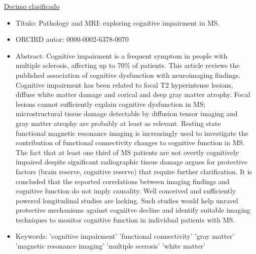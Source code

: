 \documentclass[size=a4, parskip=half, titlepage=false, toc=flat, toc=bib, 12pt]{scrartcl}
\theoremstyle{theorem-style}
\theoremstyle{definition-style}
\theoremstyle{remark-style}
\theoremstyle{example-style}
\theoremstyle{definition-style}
\theoremstyle{remark-style}
\begin{document}
\underline{Decimo clasificado}
\begin{itemize}
\item Título: Pathology and MRI: exploring cognitive impairment in MS.
\item ORCIRD autor: 0000-0002-6378-0070
\item Abstract: Cognitive impairment is a frequent symptom in people with multiple sclerosis, affecting up to 70\% of patients. This article reviews the published association of cognitive dysfunction with neuroimaging findings. Cognitive impairment has been related to focal T2 hyperintense lesions, diffuse white matter damage and corical and deep gray matter atrophy. Focal lesions cannot sufficiently explain cognitive dysfunction in MS; microstructural tissue damage detectable by diffusion tensor imaging and gray matter atrophy are probably at least as relevant. Resting state functional magnetic resonance imaging is increasingly used to investigate the contribution of functional connectivity changes to cognitive function in MS. The fact that at least one third of MS patients are not overtly cognitively impaired despite significant radiographic tissue damage argues for protective factors (brain reserve, cognitive reserve) that require further clarification. It is concluded that the reported correlations between imaging findings and cognitive function do not imply causality. Well conceived and sufficiently powered longitudinal studies are lacking. Such studies would help unravel protective mechanisms against cogniitve decline and identify suitable imaging techniques to monitor cognitive function in individual patients with MS.
\item Keywords: 'cognitive impairment' 'functional connectivity' 'gray matter'
  'magnetic resonance imaging' 'multiple scerosis' 'white matter'
\end{itemize}
\end{document}
